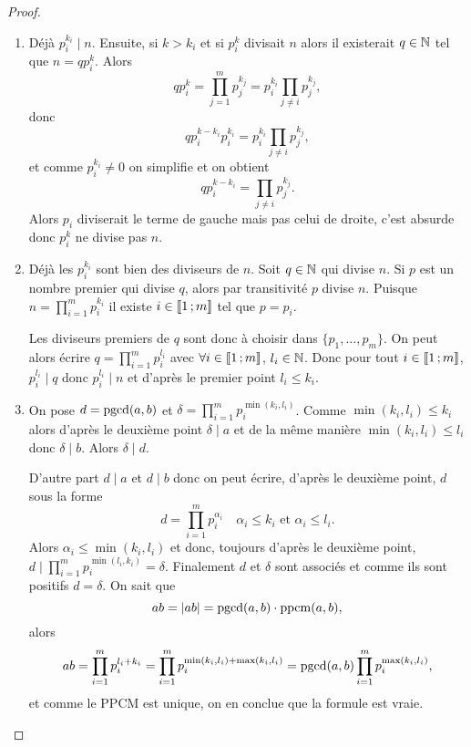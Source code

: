 \begin{proof}
  \begin{enumerate}
  \item Déjà \(p_i^{k_i} \mid n\). Ensuite, si \(k > k_i\) et si \(p_i^k\) divisait \(n\) alors il existerait \(q \in \mathbb{N}\) tel que \(n=q p_i^k\). Alors
    \begin{equation}
      qp_i^k = \prod_{j=1}^m p_j^{k_j} = p_i^{k_i} \prod_{j \neq i} p_j^{k_j},
    \end{equation}
    donc
    \begin{equation}
      qp_i^{k-k_i}p_i^{k_i} =  p_i^{k_i} \prod_{j \neq i} p_j^{k_j},
    \end{equation}
    et comme \(p_i^{k_i} \neq 0\) on simplifie et on obtient
    \begin{equation}
      qp_i^{k-k_i} = \prod_{j \neq i} p_j^{k_j}.
    \end{equation}
    Alors \(p_i\) diviserait le terme de gauche mais pas celui de droite, c'est absurde donc \(p_i^k\) ne divise pas \(n\).
  \item Déjà les \(p_i^{k_i}\) sont bien des diviseurs de \(n\). Soit \(q \in \mathbb{N}\) qui divise \(n\). Si \(p\) est un nombre premier qui divise \(q\), alors par transitivité \(p\) divise \(n\). Puisque \(n=\prod_{i=1}^m p_i^{k_i}\) il existe \(i \in \mathopen{\llbracket}1\mathclose{}\mathpunct{};m\mathclose{\rrbracket}\) tel que \(p=p_i\).

    Les diviseurs premiers de \(q\) sont donc à choisir dans \(\{p_1, \ldots, p_m\}\). On peut alors écrire \(q=\prod_{i=1}^m p_i^{l_i}\) avec \(\forall i \in \mathopen{\llbracket}1\mathclose{}\mathpunct{};m\mathclose{\rrbracket}\), \(l_i \in \mathbb{N}\). Donc pour tout \(i\in \mathopen{\llbracket}1\mathclose{}\mathpunct{};m\mathclose{\rrbracket}\), \(p_i^{l_i} \mid q\) donc \(p_i^{l_i} \mid n\) et d'après le premier point \(l_i \leqslant k_i\).
  \item On pose \(d= \operatorname{pgcd}(a,b)\) et \(\delta = \prod_{i=1}^m p_i^{\min(k_i,l_i)}\). Comme \(\min(k_i, l_i) \leqslant k_i\) alors d'après le deuxième point \(\delta \mid a\) et de la même manière \(\min(k_i, l_i) \leqslant l_i\) donc \(\delta \mid b\). Alors \(\delta \mid d\).

    D'autre part \(d \mid a\) et \(d \mid b\) donc on peut écrire, d'après le deuxième point, \(d\) sous la forme
    \begin{equation}
      d = \prod_{i=1}^m p_i^{\alpha_i} \quad \alpha_i \leqslant k_i \text{~et~} \alpha_i \leqslant l_i.
    \end{equation}
    Alors \(\alpha_i \leqslant \min(k_i,l_i)\) et donc, toujours d'après le deuxième point, \(d \mid \prod_{i=1}^m p_i ^{\min(l_i,k_i)}=\delta\). Finalement \(d\) et \(\delta\) sont associés et comme ils sont positifs \(d=\delta\). On sait que
    \begin{equation}
      ab=\left\lvert ab\right\rvert = \operatorname{pgcd}(a,b) \cdot \operatorname{ppcm}(a,b),
    \end{equation}
    alors
    \begin{equation}
      ab = \prod_{i=1}^m p_i^{l_i+k_i}= \prod_{i=1}^m p_i^{\min(k_i,l_i)+\max(k_i,l_i)} = \operatorname{pgcd}(a,b) \prod_{i=1}^m p_i^{\max(k_i,l_i)},
    \end{equation}
    et comme le PPCM est unique, on en conclue que la formule est vraie.
  \end{enumerate}
\end{proof}


